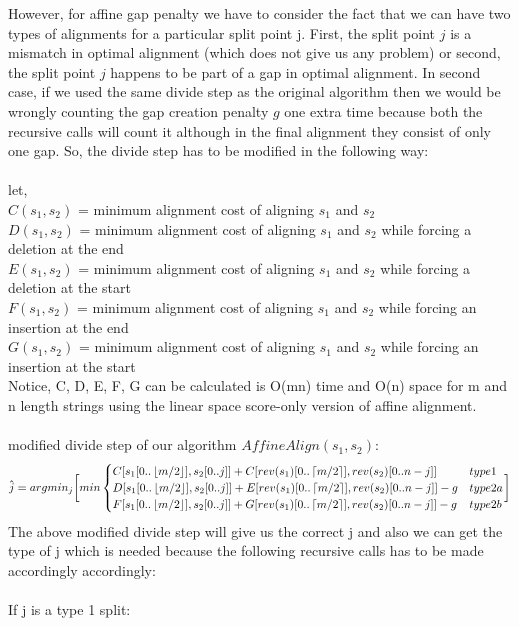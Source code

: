\documentclass[a4paper,11pt]{article}
\begin{document}
However, for affine gap penalty we have to consider the fact that we can have two types of alignments for a particular split point j. First, the split point $j$ is a mismatch in optimal alignment (which does not give us any problem) or second, the split point $j$ happens to be part of a gap in optimal alignment. In second case, if we used the same divide step as the original algorithm then we would be wrongly counting the gap creation penalty $g$ one extra time because both the recursive calls will count it although in the final alignment they consist of only one gap. So, the divide step has to be modified in the following way:\\
\\
let,\\
$C(s_1,s_2)$ =  minimum  alignment cost of aligning $s_1$ and $s_2$\\
$D(s_1,s_2)$ =  minimum  alignment cost of aligning $s_1$ and $s_2$ while forcing a deletion at the end\\
$E(s_1,s_2)$ =  minimum  alignment cost of aligning $s_1$ and $s_2$ while forcing a deletion at the start\\
$F(s_1,s_2)$ =  minimum  alignment cost of aligning $s_1$ and $s_2$ while forcing an insertion at the end\\
$G(s_1,s_2)$ =  minimum  alignment cost of aligning $s_1$ and $s_2$ while forcing an insertion  at the start\\
Notice, C, D, E, F, G can be calculated is O(mn) time and O(n) space for m and n length strings using the linear space score-only version of affine alignment.\\
\\
modified divide step of our algorithm $AffineAlign(s_1,s_2)$:\\

\begin{align*}
 \hat{j} = argmin_{j}\biggl[ min\begin{cases}
                        C[s_1[0..\left\lfloor m/2 \right\rfloor],s_2[0..j]] + C[rev(s_1)[0..\left\lceil m/2 \right\rceil], rev(s_2)[0..n-j]] & type 1\\
D[s_1[0..\left\lfloor m/2 \right\rfloor],s_2[0..j]] + E[rev(s_1)[0..\left\lceil m/2 \right\rceil], rev(s_2)[0..n-j]] -g& type 2a \\
F[s_1[0..\left\lfloor m/2 \right\rfloor],s_2[0..j]] + G[rev(s_1)[0..\left\lceil m/2 \right\rceil], rev(s_2)[0..n-j]] -g& type 2b                        \end{cases}
\biggr]
\end{align*}
 The above modified divide step will give us the correct j and also we can get the type of j which is needed because the following recursive calls has to be made accordingly accordingly:\\
 \\
 If j is a type 1 split:
 
\end{document}
